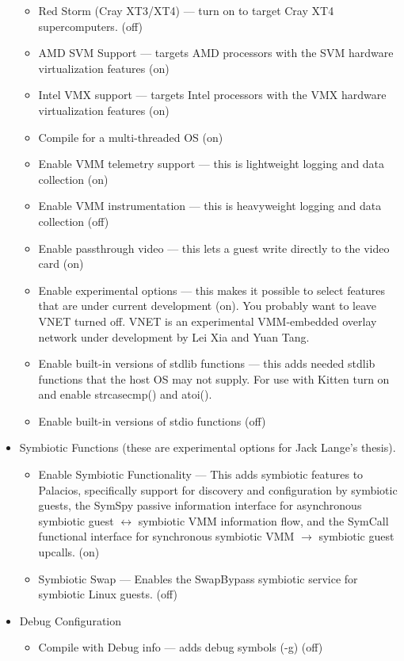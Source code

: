 \documentclass[11pt]{article}
\begin{document}
\begin{itemize}
\begin{itemize}
\item Red Storm (Cray XT3/XT4) --- turn on to target Cray XT4
supercomputers.  (off)
\item AMD SVM Support --- targets AMD processors with the SVM hardware
virtualization features (on)
\item Intel VMX support --- targets Intel processors with the VMX
hardware virtualization features (on)
\item Compile for a multi-threaded OS (on)
\item Enable VMM telemetry support --- this is lightweight logging and
data collection (on)  
\item Enable VMM instrumentation --- this is heavyweight logging and
data collection (off)
\item Enable passthrough video --- this lets a guest write directly to
the video card (on)
\item Enable experimental options --- this makes it possible to select
features that are under current development (on).  You probably want
to leave VNET turned off.  VNET is an experimental VMM-embedded
overlay network under development by Lei Xia and Yuan Tang.
\item Enable built-in versions of stdlib functions --- this adds
needed stdlib functions that the host OS may not supply.  For use with
Kitten turn on and enable strcasecmp() and atoi().
\item Enable built-in versions of stdio functions (off)
\end{itemize}
\item Symbiotic Functions (these are experimental options for Jack
Lange's thesis). 
\begin{itemize}
\item Enable Symbiotic Functionality --- This adds symbiotic features
to Palacios, specifically support for discovery and configuration by
symbiotic guests, the SymSpy passive information interface for
asynchronous symbiotic guest $\leftrightarrow$ symbiotic VMM
information flow, and the SymCall functional interface for synchronous
symbiotic VMM $\rightarrow$ symbiotic guest upcalls.  (on)
\item Symbiotic Swap --- Enables the SwapBypass symbiotic service for
symbiotic Linux guests.  (off)
\end{itemize}
\item Debug Configuration
\begin{itemize}
\item Compile with Debug info --- adds debug symbols (-g)  (off)

\end{itemize}
\end{itemize}
\end{document}
